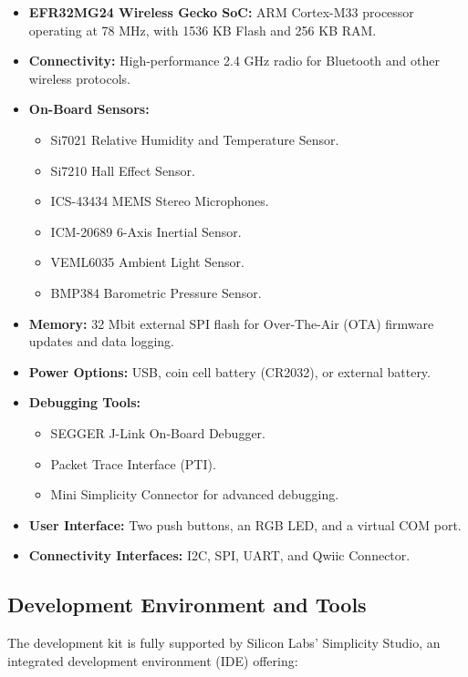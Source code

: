 \documentclass[
  9pt,
  letterpaper,
  abstract,
  titlepage]{scrbook}
\begin{document}
\begin{itemize}
\item
  \textbf{EFR32MG24 Wireless Gecko SoC:} ARM Cortex-M33 processor
  operating at 78 MHz, with 1536 KB Flash and 256 KB RAM.
\item
  \textbf{Connectivity:} High-performance 2.4 GHz radio for Bluetooth
  and other wireless protocols.
\item
  \textbf{On-Board Sensors:}

  \begin{itemize}
  \item
    Si7021 Relative Humidity and Temperature Sensor.
  \item
    Si7210 Hall Effect Sensor.
  \item
    ICS-43434 MEMS Stereo Microphones.
  \item
    ICM-20689 6-Axis Inertial Sensor.
  \item
    VEML6035 Ambient Light Sensor.
  \item
    BMP384 Barometric Pressure Sensor.
  \end{itemize}
\item
  \textbf{Memory:} 32 Mbit external SPI flash for Over-The-Air (OTA)
  firmware updates and data logging.
\item
  \textbf{Power Options:} USB, coin cell battery (CR2032), or external
  battery.
\item
  \textbf{Debugging Tools:}

  \begin{itemize}
  \item
    SEGGER J-Link On-Board Debugger.
  \item
    Packet Trace Interface (PTI).
  \item
    Mini Simplicity Connector for advanced debugging.
  \end{itemize}
\item
  \textbf{User Interface:} Two push buttons, an RGB LED, and a virtual
  COM port.
\item
  \textbf{Connectivity Interfaces:} I2C, SPI, UART, and Qwiic Connector.
\end{itemize}

\subsection{Development Environment and
Tools}\label{development-environment-and-tools}

The development kit is fully supported by Silicon Labs' Simplicity
Studio, an integrated development environment (IDE) offering:
\end{document}
